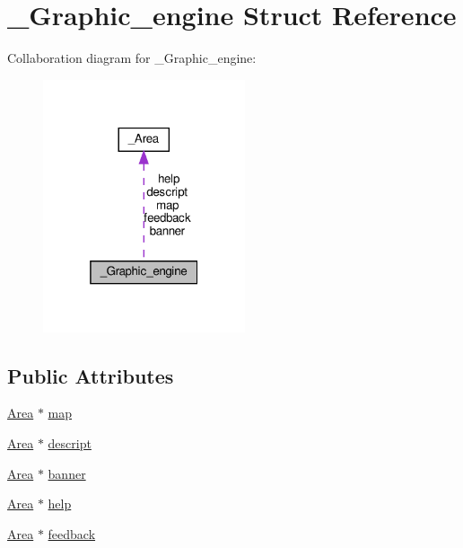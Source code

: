 \hypertarget{struct__Graphic__engine}{}\section{\+\_\+\+Graphic\+\_\+engine Struct Reference}
\label{struct__Graphic__engine}


Collaboration diagram for \+\_\+\+Graphic\+\_\+engine\+:\nopagebreak
\begin{figure}[H]
\begin{center}
\leavevmode
\includegraphics[width=169pt]{struct__Graphic__engine__coll__graph}
\end{center}
\end{figure}
\subsection*{Public Attributes}
\begin{DoxyCompactItemize}
\item 
\hyperlink{screen_8h_acfdfc42f6522d75fa3c16713afde8127}{Area} $\ast$ \hyperlink{struct__Graphic__engine_a1ea06bb881d335da8c31d63b3e834bdb}{map}
\item 
\hyperlink{screen_8h_acfdfc42f6522d75fa3c16713afde8127}{Area} $\ast$ \hyperlink{struct__Graphic__engine_a414bb888ecce3389c7ce348264758e58}{descript}
\item 
\hyperlink{screen_8h_acfdfc42f6522d75fa3c16713afde8127}{Area} $\ast$ \hyperlink{struct__Graphic__engine_a440dfb2c23c3c4b7d3871187371117b9}{banner}
\item 
\hyperlink{screen_8h_acfdfc42f6522d75fa3c16713afde8127}{Area} $\ast$ \hyperlink{struct__Graphic__engine_ade1d3e95ad6def427f613a4a2d101875}{help}
\item 
\hyperlink{screen_8h_acfdfc42f6522d75fa3c16713afde8127}{Area} $\ast$ \hyperlink{struct__Graphic__engine_a4fc0ef353d000b20d57fb75d898c6d2d}{feedback}
\end{DoxyCompactItemize}


